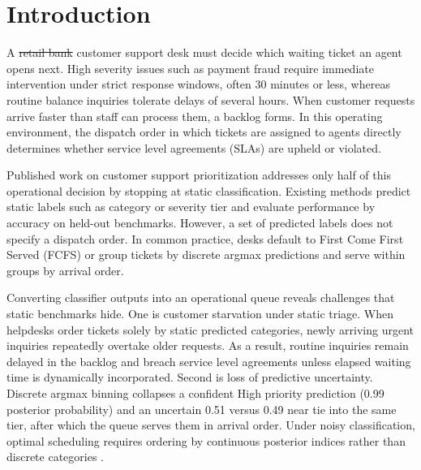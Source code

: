 \section{Introduction}
\label{sec:intro}

A \sout{retail bank} customer support desk must decide which waiting ticket an agent opens next. High severity issues such as payment fraud require immediate intervention under strict response windows, often 30 minutes or less, whereas routine balance inquiries tolerate delays of several hours. When customer requests arrive faster than staff can process them, a backlog forms. In this operating environment, the dispatch order in which tickets are assigned to agents directly determines whether service level agreements (SLAs) are upheld or violated.

Published work on customer support prioritization addresses only half of this operational decision by stopping at static classification. Existing methods predict static labels such as category or severity tier and evaluate performance by accuracy on held-out benchmarks. However, a set of predicted labels does not specify a dispatch order. In common practice, desks default to First Come First Served (FCFS) or group tickets by discrete argmax predictions and serve within groups by arrival order.

Converting classifier outputs into an operational queue reveals challenges that static benchmarks 
hide. One is customer starvation under static triage. When helpdesks order tickets solely by 
static predicted categories, newly arriving urgent inquiries repeatedly overtake older requests. 
As a result, routine inquiries remain delayed in the backlog and breach service level agreements 
unless elapsed waiting time is dynamically incorporated. Second is loss of predictive uncertainty. 
Discrete argmax binning collapses a confident High priority prediction (0.99 posterior probability) 
and an uncertain 0.51 versus 0.49 near tie into the same tier, after which the queue serves them 
in arrival order. Under noisy classification, optimal scheduling requires ordering by continuous 
posterior indices rather than discrete categories \cite{argon2009priority}.


